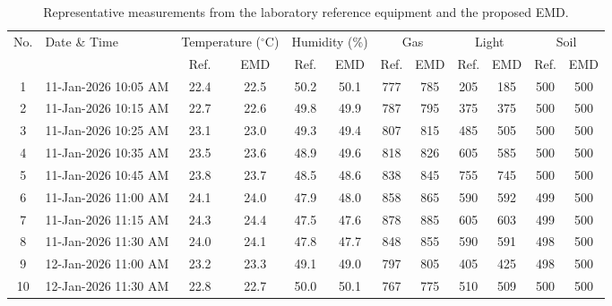 ﻿\documentclass[journal]{IEEEtran}
\begin{document}
\begin{table}[!t]
    \centering
    \caption{Representative measurements from the laboratory reference
    equipment and the proposed EMD.}
    \label{tab:measurement_verification}

    \renewcommand{\arraystretch}{1.05}
    \setlength{\tabcolsep}{3.2pt}

    \begin{tabular}{c l cc cc cc cc cc}
        \toprule
        \multirow{2}{*}{No.} &
        \multirow{2}{*}{Date \& Time} &
        \multicolumn{2}{c}{Temperature ($^\circ$C)} &
        \multicolumn{2}{c}{Humidity (\%)} &
        \multicolumn{2}{c}{Gas} &
        \multicolumn{2}{c}{Light} &
        \multicolumn{2}{c}{Soil} \\
        
        \cmidrule(lr){3-4}
        \cmidrule(lr){5-6}
        \cmidrule(lr){7-8}
        \cmidrule(lr){9-10}
        \cmidrule(lr){11-12}
        
        &
        &
        Ref. & EMD &
        Ref. & EMD &
        Ref. & EMD &
        Ref. & EMD &
        Ref. & EMD \\
        
        \midrule
        
        1 & 11-Jan-2026 10:05 AM &
        22.4 & 22.5 & 50.2 & 50.1 & 777 & 785 & 205 & 185 & 500 & 500 \\

        2 & 11-Jan-2026 10:15 AM &
        22.7 & 22.6 & 49.8 & 49.9 & 787 & 795 & 375 & 375 & 500 & 500 \\

        3 & 11-Jan-2026 10:25 AM &
        23.1 & 23.0 & 49.3 & 49.4 & 807 & 815 & 485 & 505 & 500 & 500 \\

        4 & 11-Jan-2026 10:35 AM &
        23.5 & 23.6 & 48.9 & 49.6 & 818 & 826 & 605 & 585 & 500 & 500 \\

        5 & 11-Jan-2026 10:45 AM &
        23.8 & 23.7 & 48.5 & 48.6 & 838 & 845 & 755 & 745 & 500 & 500 \\

        6 & 11-Jan-2026 11:00 AM &
        24.1 & 24.0 & 47.9 & 48.0 & 858 & 865 & 590 & 592 & 499 & 500 \\

        7 & 11-Jan-2026 11:15 AM &
        24.3 & 24.4 & 47.5 & 47.6 & 878 & 885 & 605 & 603 & 499 & 500 \\

        8 & 11-Jan-2026 11:30 AM &
        24.0 & 24.1 & 47.8 & 47.7 & 848 & 855 & 590 & 591 & 498 & 500 \\

        9 & 12-Jan-2026 11:00 AM &
        23.2 & 23.3 & 49.1 & 49.0 & 797 & 805 & 405 & 425 & 498 & 500 \\

        10 & 12-Jan-2026 11:30 AM &
        22.8 & 22.7 & 50.0 & 50.1 & 767 & 775 & 510 & 509 & 500 & 500 \\

        \bottomrule
    \end{tabular}
\end{table}
\end{document}
